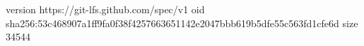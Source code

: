 version https://git-lfs.github.com/spec/v1
oid sha256:53c468907a1ff9fa0f38f4257663651142e2047bbb619b5dfe55c563fd1cfe6d
size 34544
